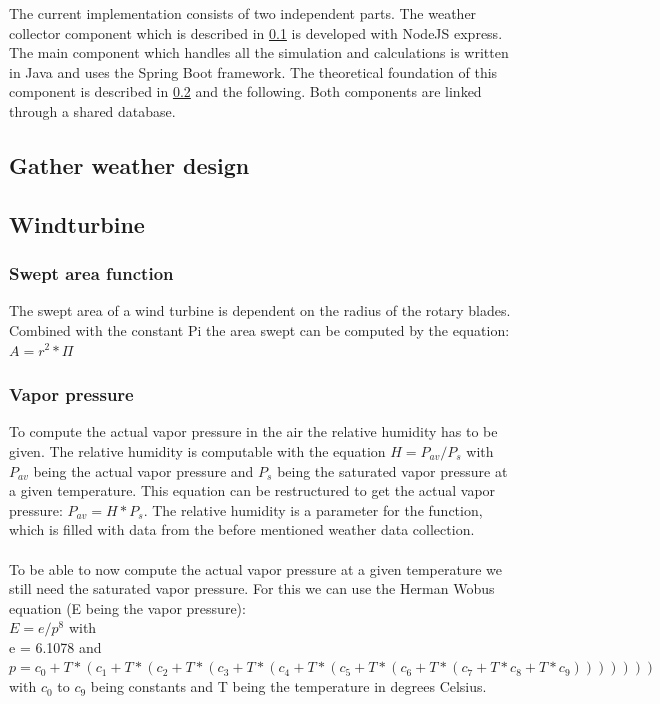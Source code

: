 The current implementation consists of two independent parts. The weather collector component which is described in \cref{subsec:weather} is developed with  NodeJS express. The main component which handles all the simulation and calculations is written in Java and uses the Spring Boot framework. The theoretical foundation of this component is described in \cref{subsec:Windturbine} and the following. Both components are linked through a shared database.

\subsection{Gather weather design}\label{subsec:weather}


\subsection{Windturbine}\label{subsec:Windturbine}
\subsubsection{Swept area function}
The swept area of a wind turbine is dependent on the radius of the rotary blades. Combined with the constant Pi the area swept can be computed by the equation\cite{Beckmann}: $A = r^{2}* \Pi  $
\subsubsection{Vapor pressure}
To compute the actual vapor pressure in the air the relative humidity has to be given. The relative humidity is computable with the equation $H = P_{av} / P_s$ with $P_{av}$ being the actual vapor pressure and $P_s$ being the saturated vapor pressure at a given temperature. This equation can be restructured to get the actual vapor pressure: $P_{av}  = H * P_s$. The relative humidity is a parameter for the function, which is filled with data from the before mentioned weather data collection.\\
\\
To be able to now compute the actual vapor pressure at a given temperature we still need the saturated vapor pressure. For this we can use the Herman Wobus equation (E being the vapor pressure):\\
$E = e/p^{8}$ with\\
e = 6.1078 and\\
$p = c_0 + T * (c_1 + T * (c_2 + T * (c_3 + T * (c_4 + T *(c_5 + T * (c_6 + T * (c_7 + T * c_8 + T * c_9)))))))$\\
with $c_0$ to $c_9$ being constants and T being the temperature in degrees Celsius.\cite{AirDensity,NOAA}
